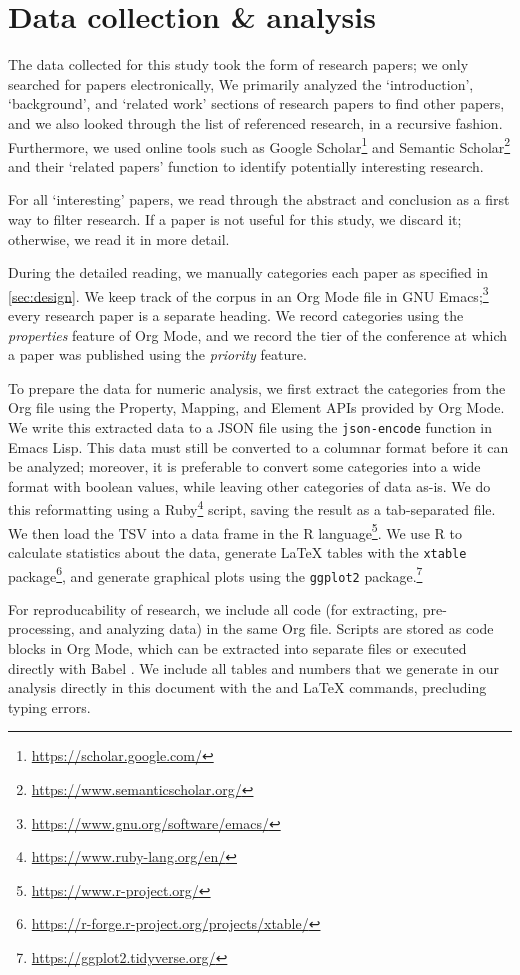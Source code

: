 \section{Data collection \& analysis}
The data collected for this study took the form of research papers; we only searched for papers electronically,
We primarily analyzed the `introduction', `background', and `related work' sections of research papers to find other papers, and we also looked through the list of referenced research, in a recursive fashion.
Furthermore, we used online tools such as Google Scholar\footnote{\url{https://scholar.google.com/}} and Semantic Scholar\footnote{\url{https://www.semanticscholar.org/}} and their `related papers' function to identify potentially interesting research.

For all `interesting' papers, we read through the abstract and conclusion as a first way to filter research.
If a paper is not useful for this study, we discard it; otherwise, we read it in more detail.

During the detailed reading, we manually categories each paper as specified in \autoref{sec:design}.
We keep track of the corpus in an Org Mode \autocite{orgmode} file in GNU Emacs;\footnote{\url{https://www.gnu.org/software/emacs/}} every research paper is a separate heading.
We record categories using the \textit{properties} feature of Org Mode, and we record the tier of the conference at which a paper was published using the \textit{priority} feature.

To prepare the data for numeric analysis, we first extract the categories from the Org file using the Property, Mapping, and Element APIs \autocite{orgmode} provided by Org Mode.
We write this extracted data to a JSON file using the \texttt{json-encode} function in Emacs Lisp.
This data must still be converted to a columnar format before it can be analyzed; moreover, it is preferable to convert some categories into a wide format with boolean values, while leaving other categories of data as-is.
We do this reformatting using a Ruby\footnote{\url{https://www.ruby-lang.org/en/}} script, saving the result as a tab-separated file.
We then load the TSV into a data frame in the R language\footnote{\url{https://www.r-project.org/}}.
We use R to calculate statistics about the data, generate LaTeX tables with the \texttt{xtable} package\footnote{\url{https://r-forge.r-project.org/projects/xtable/}}, and generate graphical plots using the \texttt{ggplot2} package.\footnote{\url{https://ggplot2.tidyverse.org/}}

For reproducability of research, we include all code (for extracting, pre-processing, and analyzing data) in the same Org file.
Scripts are stored as code blocks in Org Mode, which can be extracted into separate files or executed directly with Babel \autocite{orgmode}.
We include all tables and numbers that we generate in our analysis directly in this document with the \verb|| and \verb|| LaTeX commands, precluding typing errors.
